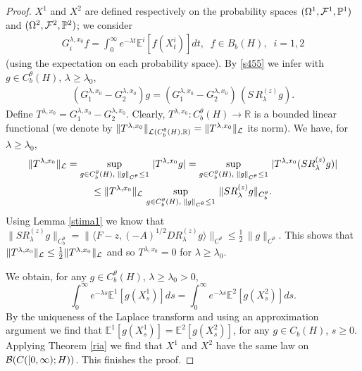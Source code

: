 \documentclass[preprint]{imsart}
\def\P{\mathbb P}
\def\E{\mathbb E}
\def\R{\mathbb R}
\begin{document}
\begin{proof}
\vskip 1mm  

\vskip 1mm  
  $X^1$ and $X^2$ are defined respectively on the   probability spaces $ (\Omega^1, {\cal F}^1, \P^1)$ and $ (\Omega^2, {\cal F}^2, \P^2)$; we consider 
\begin{gather*}
G^{\lambda,x_0}_i f =  \int_0^{\infty} e^{-\lambda t} \E^{i}  [f(X_t^i)] dt, \;\;
 f \in B_b^{}(H),\;\; i =1,2
\end{gather*}
(using the expectation on each probability space).  By \eqref{s455} we infer with $g \in C_b^{\theta}(H)$, $\lambda \ge \lambda_0$,
\begin{gather*}
(G^{\lambda,x_0}_1 -  G^{\lambda,x_0}_2) g =   (G^{\lambda,x_0}_1 -  G^{\lambda,x_0}_2) \,  (S \, R^{(z)}_{\lambda} g).
\end{gather*}
Define  $T^{\lambda ,x_0}  = G^{\lambda,x_0}_1 -  G^{\lambda,x_0}_2$. 
 Clearly,  $T^{\lambda ,x_0} :  C_b^{\theta}(H) \to \R$ is a bounded linear  functional (we denote by $\| T^{\lambda ,x_0}\|_{{\cal L}(C_b^{\theta}(H), \R )} = \| T^{\lambda ,x_0}\|_{{\cal L}}$ its norm).
 We have,  for $\lambda \ge \lambda _0$,
\begin{gather*}
 \| T^{\lambda ,x_0} \|_{{\cal L}} 
 = \sup_{ g \in  C_b^{\theta}(H),\; \| g\|_{C^{\theta}} \le 1  } \, 
  | T^{\lambda ,x_0} g |  
  = \sup_{ g \in  C_b^{\theta}(H),\; \| g\|_{C^{\theta}} \le 1  } \, 
  | T^{\lambda ,x_0} (S R^{(z)}_{\lambda} g)  | 
 \\ \le \| T^{\lambda ,x_0} \|_{{\cal L}} \,  \sup_{ g \in  C_b^{\theta}(H),\; \| g\|_{C^{\theta}} \le 1  }   \,\| S R^{(z)}_{\lambda} g \|_{C_b^{\theta}}.
\end{gather*}
Using Lemma \ref{stima1} we know that $\| S R^{(z)}_{\lambda} g \|_{C_b^{\theta}} = \|  \langle F - z, (-A)^{1/2} D R^{(z)}_{\lambda} g \rangle \|_{C^{\theta}} \le \frac{1}{2} \, \| g  \|_{C^{\theta}}$. This shows that $\| T^{\lambda ,x_0} \|_{{\cal L}}  \le \frac{1}{2}\| T^{\lambda ,x_0} \|_{{\cal L}}  $  and so $ T^{\lambda ,x_0} =0$ for $\lambda \ge \lambda_0$. 
 
We obtain, for any $g \in C_b^{\theta}(H)$,  $\lambda \ge \lambda_0 >0$, 
  $$ 
  \int_{0}^{\infty}  e^{- \lambda s}  
 \E^1 [g (X_{s}^1)]ds =   \int_{0}^{\infty}  e^{- \lambda s}  
\E^2 [g (X_{s}^2)]ds.
$$  
By the  uniqueness of the Laplace transform and using an approximation argument we find that 
$ \E^1 [g (X_{s}^1)] =  \E^2 [g (X_{s}^2)]$, for any $g \in C_b (H)$, $s \ge 0$.
 Applying   Theorem \ref{ria} we find that $X^1$ and $X^2$ have the same law on  ${\cal B}(C([0, \infty); H))$.  
 This finishes the proof. 
  \end{proof}  
 
\end{document}
